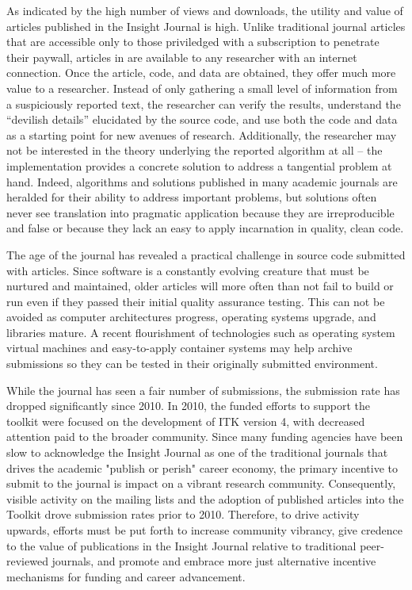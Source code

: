 \documentclass{frontiersENG} %
\begin{document}
As indicated by the high number of views and downloads, the utility and value of
articles published in the Insight Journal is high.  Unlike traditional
journal articles that are accessible only to those priviledged with a
subscription to penetrate their paywall, articles in are available to any
researcher with an internet connection. Once the article, code, and data are
obtained, they offer much more value to a researcher. Instead of only gathering a
small level of information from a suspiciously reported text, the researcher
can verify the results, understand the ``devilish details'' elucidated by the
source code, and use both the code and data as a starting point for new
avenues of research. Additionally, the researcher may not be interested in the
theory underlying the reported algorithm at all -- the implementation provides
a concrete solution to address a tangential problem at hand. Indeed,
algorithms and solutions published in many academic journals are heralded for
their ability to address important problems, but solutions often never see
translation into pragmatic application because they are irreproducible and
false or because they lack an easy to apply incarnation in quality, clean
code.

The age of the journal has revealed a practical challenge in source code
submitted with articles. Since software is a constantly evolving creature that
must be nurtured and maintained, older articles will more often than not fail
to build or run even if they passed their initial quality assurance testing.
This can not be avoided as computer architectures progress, operating systems
upgrade, and libraries mature. A recent flourishment of technologies such as
operating system virtual machines and easy-to-apply container systems may help
archive submissions so they can be tested in their originally submitted
environment.

While the journal has seen a fair number of submissions, the submission rate
has dropped significantly since 2010. In 2010, the funded efforts to support
the toolkit were focused on the development of ITK version 4, with decreased
attention paid to the broader community.  Since many funding agencies have been
slow to acknowledge the Insight Journal as one of the traditional journals
that drives the academic "publish or perish" career economy, the primary
incentive to submit to the journal is impact on a vibrant research community.
Consequently, visible activity on the mailing lists and the adoption of published
articles into the Toolkit drove submission rates prior to 2010. Therefore, to
drive activity upwards, efforts must be put forth to increase community
vibrancy, give credence to the value of publications in the Insight Journal
relative to traditional peer-reviewed journals, and promote and embrace more
just alternative incentive mechanisms for funding and career advancement.
\end{document}

